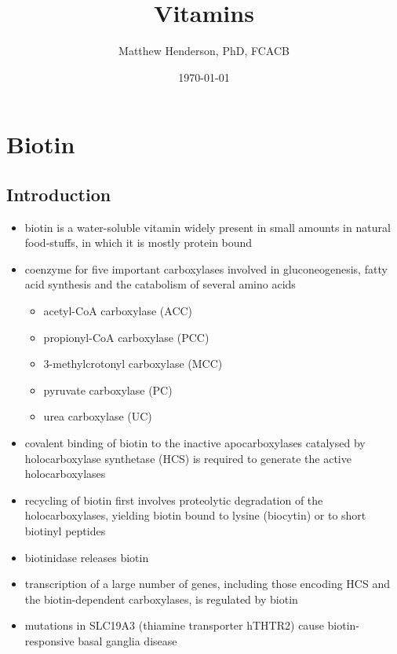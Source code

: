 \documentclass[12pt]{scrartcl}
\author{Matthew Henderson, PhD, FCACB}
\date{\today}
\title{Vitamins}
\begin{document}
\maketitle
\setcounter{tocdepth}{2}
\tableofcontents



\section{Biotin}
\label{sec:org03dd417}
\subsection{Introduction}
\label{sec:org70fd1cb}
\begin{itemize}
\item biotin is a water-soluble vitamin widely present in small amounts in
natural food-stuffs, in which it is mostly protein bound
\item coenzyme for five important carboxylases involved in
gluconeogenesis, fatty acid synthesis and the catabolism of several
amino acids
\begin{itemize}
\item acetyl-CoA carboxylase (ACC)
\end{itemize}
\begin{itemize}
\item propionyl-CoA carboxylase (PCC)
\end{itemize}
\begin{itemize}
\item 3-methylcrotonyl carboxylase (MCC)
\end{itemize}
\begin{itemize}
\item pyruvate carboxylase (PC)
\end{itemize}
\begin{itemize}
\item urea carboxylase (UC)
\end{itemize}

\item covalent binding of biotin to the inactive apocarboxylases
catalysed by holocarboxylase synthetase (HCS) is required to
generate the active holocarboxylases
\item recycling of biotin first involves proteolytic degradation of the
holocarboxylases, yielding biotin bound to lysine (biocytin) or to
short biotinyl peptides
\item biotinidase releases biotin
\item transcription of a large number of genes, including those encoding
HCS and the biotin-dependent carboxylases, is regulated by biotin
\item mutations in SLC19A3 (thiamine transporter hTHTR2) cause
biotin-responsive basal ganglia disease
\end{itemize}
\end{document}
